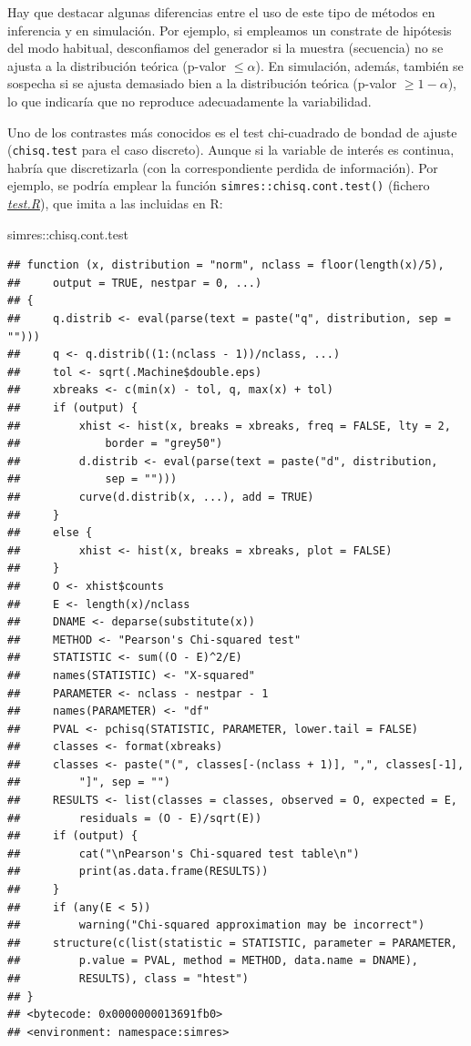 \documentclass[
]{book}
\newenvironment{Shaded}{\begin{snugshade}}{\end{snugshade}}
\newcommand{\NormalTok}[1]{#1}
\newcommand{\SpecialCharTok}[1]{\textcolor[rgb]{0.00,0.00,0.00}{#1}}
\theoremstyle{break}
\theoremstyle{nonumberplain}
\begin{document}
Hay que destacar algunas diferencias entre el uso de este tipo de métodos en inferencia y en simulación.
Por ejemplo, si empleamos un constrate de hipótesis del modo habitual, desconfiamos del generador si la muestra (secuencia) no se ajusta a la distribución teórica (p-valor \(\leq \alpha\)).
En simulación, además, también se sospecha si se ajusta demasiado bien a la distribución teórica (p-valor \(\geq1-\alpha\)), lo que indicaría que no reproduce adecuadamente la variabilidad.

Uno de los contrastes más conocidos es el test chi-cuadrado de bondad de ajuste (\texttt{chisq.test} para el caso discreto).
Aunque si la variable de interés es continua, habría que discretizarla (con la correspondiente perdida de información).
Por ejemplo, se podría emplear la función \texttt{simres::chisq.cont.test()} (fichero \href{R/test.R}{\emph{test.R}}), que imita a las incluidas en R:

\begin{Shaded}
\begin{Highlighting}[]
\NormalTok{simres}\SpecialCharTok{::}\NormalTok{chisq.cont.test}
\end{Highlighting}
\end{Shaded}

\begin{verbatim}
## function (x, distribution = "norm", nclass = floor(length(x)/5), 
##     output = TRUE, nestpar = 0, ...) 
## {
##     q.distrib <- eval(parse(text = paste("q", distribution, sep = "")))
##     q <- q.distrib((1:(nclass - 1))/nclass, ...)
##     tol <- sqrt(.Machine$double.eps)
##     xbreaks <- c(min(x) - tol, q, max(x) + tol)
##     if (output) {
##         xhist <- hist(x, breaks = xbreaks, freq = FALSE, lty = 2, 
##             border = "grey50")
##         d.distrib <- eval(parse(text = paste("d", distribution, 
##             sep = "")))
##         curve(d.distrib(x, ...), add = TRUE)
##     }
##     else {
##         xhist <- hist(x, breaks = xbreaks, plot = FALSE)
##     }
##     O <- xhist$counts
##     E <- length(x)/nclass
##     DNAME <- deparse(substitute(x))
##     METHOD <- "Pearson's Chi-squared test"
##     STATISTIC <- sum((O - E)^2/E)
##     names(STATISTIC) <- "X-squared"
##     PARAMETER <- nclass - nestpar - 1
##     names(PARAMETER) <- "df"
##     PVAL <- pchisq(STATISTIC, PARAMETER, lower.tail = FALSE)
##     classes <- format(xbreaks)
##     classes <- paste("(", classes[-(nclass + 1)], ",", classes[-1], 
##         "]", sep = "")
##     RESULTS <- list(classes = classes, observed = O, expected = E, 
##         residuals = (O - E)/sqrt(E))
##     if (output) {
##         cat("\nPearson's Chi-squared test table\n")
##         print(as.data.frame(RESULTS))
##     }
##     if (any(E < 5)) 
##         warning("Chi-squared approximation may be incorrect")
##     structure(c(list(statistic = STATISTIC, parameter = PARAMETER, 
##         p.value = PVAL, method = METHOD, data.name = DNAME), 
##         RESULTS), class = "htest")
## }
## <bytecode: 0x0000000013691fb0>
## <environment: namespace:simres>
\end{verbatim}
\end{document}
